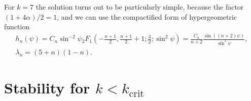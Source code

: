 For $k=7$ the solution turns out to be particularly simple, because the
factor $(1+4\alpha)/2=1$, and we can use the compactified form of
hypergeometric function
\begin{gather}
  h_n(\psi)=C_n\sin^{-2}\psi
  {}_2F_1\left(-\frac{n+1}{2},\frac{n+1}{2}+1;\frac{3}{2};\sin^2\psi\right)
  =\frac{C_n}{n+2}\frac{\sin((n+2)\psi)}{\sin^3\psi},\\
  \lambda_n=(5+n)(1-n).
\end{gather}




\section*{Stability for $k<k_{\text{crit}}$}

